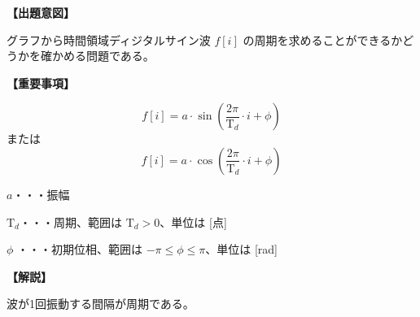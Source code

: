 \noindent \textbf{【出題意図】}

\noindent グラフから時間領域ディジタルサイン波 $f[i]$ の周期を求めることができるかどうかを確かめる問題である。

\vspace{1em}
\noindent \textbf{【重要事項】}

\[
f[i] = a \cdot \sin \left ( \frac{2 \pi}{\textrm{T}_d}  \cdot i + \phi \right )
\]
%
\noindent または
%
\[
f[i] = a \cdot \cos \left ( \frac{2 \pi}{\textrm{T}_d}  \cdot i + \phi \right )
\]

\bigskip
\noindent $a$・・・振幅

\bigskip
\noindent $\textrm{T}_d$・・・周期、範囲は $\textrm{T}_d > 0$、単位は [点]

\bigskip
\noindent $\phi$ ・・・初期位相、範囲は $-\pi \leq \phi \leq \pi$、単位は [rad]


\vspace{1em}
\noindent \textbf{【解説】}

\noindent 波が1回振動する間隔が周期である。
